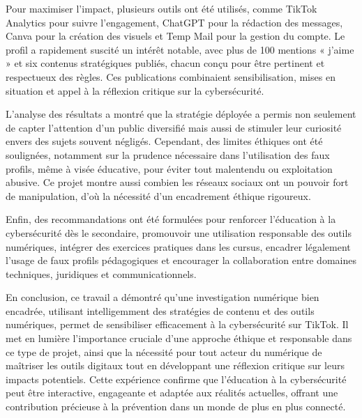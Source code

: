 \documentclass[11pt,a4paper]{article}
\begin{document}
	Pour maximiser l'impact, plusieurs outils ont été utilisés, comme TikTok Analytics pour suivre l'engagement, ChatGPT pour la rédaction des messages, Canva pour la création des visuels et Temp Mail pour la gestion du compte. Le profil a rapidement suscité un intérêt notable, avec plus de 100 mentions « j’aime » et six contenus stratégiques publiés, chacun conçu pour être pertinent et respectueux des règles. Ces publications combinaient sensibilisation, mises en situation et appel à la réflexion critique sur la cybersécurité.
	
	L'analyse des résultats a montré que la stratégie déployée a permis non seulement de capter l'attention d'un public diversifié mais aussi de stimuler leur curiosité envers des sujets souvent négligés. Cependant, des limites éthiques ont été soulignées, notamment sur la prudence nécessaire dans l'utilisation des faux profils, même à visée éducative, pour éviter tout malentendu ou exploitation abusive. Ce projet montre aussi combien les réseaux sociaux ont un pouvoir fort de manipulation, d'où la nécessité d'un encadrement éthique rigoureux.
	
	Enfin, des recommandations ont été formulées pour renforcer l’éducation à la cybersécurité dès le secondaire, promouvoir une utilisation responsable des outils numériques, intégrer des exercices pratiques dans les cursus, encadrer légalement l’usage de faux profils pédagogiques et encourager la collaboration entre domaines techniques, juridiques et communicationnels.
	
	En conclusion, ce travail a démontré qu’une investigation numérique bien encadrée, utilisant intelligemment des stratégies de contenu et des outils numériques, permet de sensibiliser efficacement à la cybersécurité sur TikTok. Il met en lumière l'importance cruciale d'une approche éthique et responsable dans ce type de projet, ainsi que la nécessité pour tout acteur du numérique de maîtriser les outils digitaux tout en développant une réflexion critique sur leurs impacts potentiels. Cette expérience confirme que l’éducation à la cybersécurité peut être interactive, engageante et adaptée aux réalités actuelles, offrant une contribution précieuse à la prévention dans un monde de plus en plus connecté.
	

	
\end{document}
